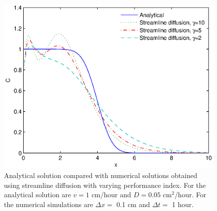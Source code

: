 \documentclass{report}
\begin{document}
\begin{figure}[htbp]  %
\includegraphics[width=\hsize]{Stab_StreamDiff.eps}
\caption{Analytical solution compared with numerical solutions
obtained using streamline diffusion with varying performance
index. For the analytical solution are $v=1$ cm/hour and
$D=0.05$ cm$^2$/hour. For the numerical simulations are
$\Delta x=$ 0.1 cm and $\Delta t=$ 1 hour.}
\label{fig:Stab_StreamDiff}
\end{figure}


%
%
%
%
%
\end{document}
